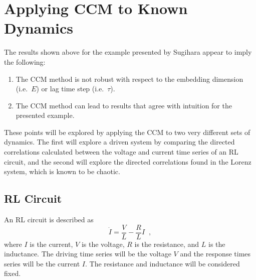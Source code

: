 \documentclass[a4paper,11pt]{article}
\begin{document}
\section{Applying CCM to Known Dynamics}
The results shown above for the example presented by Sugihara appear to imply the following:
\begin{enumerate}
\item The CCM method is not robust with respect to the embedding dimension (i.e.\ $E$) or lag time step (i.e.\ $\tau$).
\item The CCM method can lead to results that agree with intuition for the presented example. 
\end{enumerate}
These points will be explored by applying the CCM to two very different sets of dynamics.  The first will explore a driven system by comparing the directed correlations calculated between the voltage and current time series of an RL circuit, and the second will explore the directed correlations found in the Lorenz system, which is known to be chaotic.

\subsection{RL Circuit}
An RL circuit is described as
$$
\dot{I} = \frac{V}{L} - \frac{R}{L} I\;\;,
$$
where $I$ is the current, $V$ is the voltage, $R$ is the resistance, and $L$ is the inductance.  The driving time series will be the voltage $V$ and the response times series will be the current $I$.  The resistance and inductance will be considered fixed.
\end{document}
